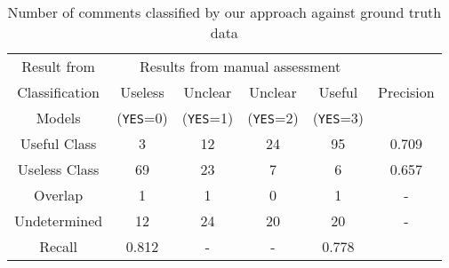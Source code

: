 \begin{table}[!t]
\centering

\caption{Number of comments classified by our approach against ground truth data}
\begin{tabular}{cccccc}
\hline
Result from & \multicolumn{4}{c}{Results from manual assessment}  & \multirow{3}{*}{Precision}\\ \cline{2-5}
Classification &  Useless  & Unclear  & Unclear & Useful \\
Models&  (\texttt{YES}=0) & (\texttt{YES}=1) & (\texttt{YES}=2) & (\texttt{YES}=3) \\
\hline \hline
Useful Class & 3 & 12 & 24 & 95 & 0.709\\
Useless Class & 69 & 23 & 7 & 6 &  0.657\\
Overlap & 1 & 1 & 0 & 1 & - \\
Undetermined & 12 & 24 & 20 & 20 & - \\
\hline
Recall & 0.812 & - & - & 0.778\\ \hline 
\end{tabular}
\label{tb:classify_number}
\end{table}


